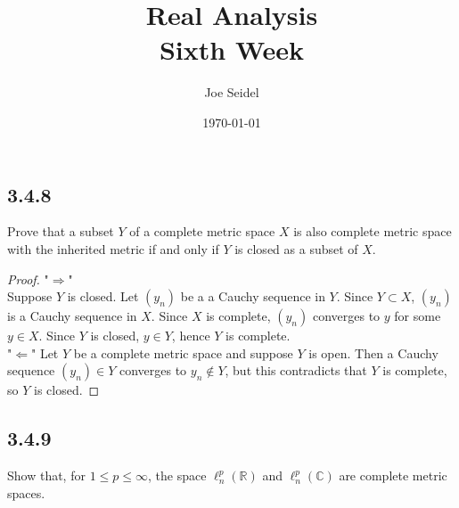 \documentclass{tufte-book}
\title{Real Analysis\\Sixth Week }
\author{Joe Seidel}
\date{\today}
\theoremstyle{mytheoremstyle}
\theoremstyle{mylemstyle}
\theoremstyle{mydefstyle}
\begin{document}
\maketitle
{}
\newpage
{}

\subsection{3.4.8}
Prove that a subset $Y$ of a complete metric space $X$ is also complete metric space with the inherited metric if and only if $Y$ is closed as a subset of $X$.

\begin{proof}"$\Rightarrow$"\\
Suppose $Y$ is closed. Let $(y_n)$ be a a Cauchy sequence in $Y$.  Since $Y \subset X$, $(y_n)$ is a Cauchy sequence in $X$.  Since $X$ is complete, $(y_n)$ converges to $y$ for some $y \in X$.  Since $Y$ is closed, $y \in Y$, hence $Y$ is complete.\\
"$\Leftarrow$" Let $Y$ be a complete metric space and suppose $Y$ is open.  Then a Cauchy sequence $(y_n) \in Y$ converges to $y_n \not\in Y$, but this contradicts that $Y$ is complete, so $Y$ is closed.

\end{proof}

\subsection{3.4.9}
Show that, for $1 \leq p \leq \infty$, the space $\ell_n^p(\mathbb{R})$ and $\ell_n^p(\mathbb{C})$ are complete metric spaces.
\end{document}
